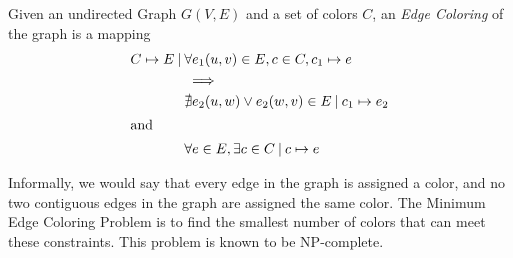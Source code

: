 Given an undirected Graph $G(V,E)$ and a set of colors $C$, an {\em Edge Coloring} of the graph is a mapping   
	\begin{align*} C \mapsto E {\: |\:} & \forall e_1(u,v) \in E, c \in C, c_1 \mapsto e \\ 
														&\implies \\
														&\nexists e_2(u,w) \vee e_2(w,v) \in E {\: |\:} c_1 \mapsto e_2 \\ 
									\intertext{and}
														& \forall e \in E, \exists c \in C {\: |\:} c \mapsto e 
\end{align*} 

Informally, we would say that every edge in the graph is assigned a color, and no two contiguous edges in the graph are assigned the same color. The Minimum Edge Coloring Problem is to find the smallest number of colors that can meet these constraints. This problem is known to be NP-complete.
